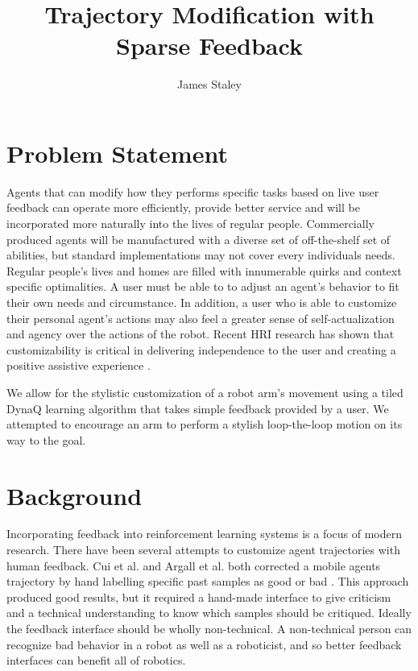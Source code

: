 \documentclass{article}
\title{Trajectory Modification with Sparse Feedback}
\author{James Staley}
\begin{document}
\maketitle

\section{Problem Statement}

Agents that can modify how they performs specific tasks based on live user feedback can operate more efficiently, provide better service and will be incorporated more naturally into the lives of regular people. Commercially produced agents will be manufactured with a diverse set of off-the-shelf set of abilities, but standard implementations may not cover every individuals needs. Regular people's lives and homes are filled with innumerable quirks and context specific optimalities. A user must be able to to adjust an agent's behavior to fit their own needs and circumstance. In addition, a user who is able to customize their personal agent's actions may also feel a greater sense of self-actualization and agency over the actions of the robot. Recent HRI research has shown that customizability is critical in delivering independence to the user and creating a positive assistive experience \cite{bhattacharjee_community-centered_2019}.

We allow for the stylistic customization of a robot arm's movement using a tiled DynaQ learning algorithm that takes simple feedback provided by a user. We attempted to encourage an arm to perform a stylish loop-the-loop motion on its way to the goal.

\section{Background}

Incorporating feedback into reinforcement learning systems is a focus of modern research. There have been several attempts to customize agent trajectories with human feedback. Cui et al. and Argall et al. both corrected a mobile agents trajectory by hand labelling specific past samples as good or bad \cite{cui_active_2018} \cite{argall_learning_2007}. This approach produced good results, but it required a hand-made interface to give criticism and a technical understanding to know which samples should be critiqued. Ideally the feedback interface should be wholly non-technical. A non-technical person can recognize bad behavior in a robot as well as a roboticist, and so better feedback interfaces can benefit all of robotics. 
\end{document}
